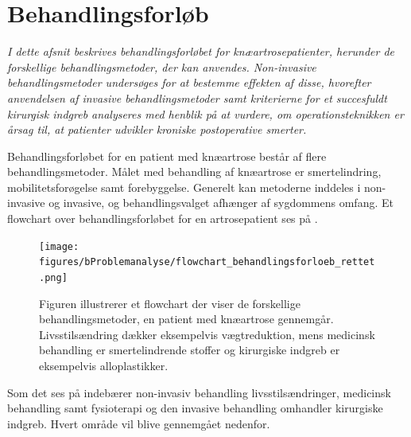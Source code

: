 \section{Behandlingsforløb}
\textit{I dette afsnit beskrives behandlingsforløbet for knæartrosepatienter, herunder de forskellige behandlingsmetoder, der kan anvendes. Non-invasive behandlingsmetoder undersøges for at bestemme effekten af disse, hvorefter anvendelsen af invasive behandlingsmetoder samt kriterierne for et succesfuldt kirurgisk indgreb analyseres med henblik på at vurdere, om operationsteknikken er årsag til, at patienter udvikler kroniske postoperative smerter.}

Behandlingsforløbet for en patient med knæartrose består af flere behandlingsmetoder. Målet med behandling af knæartrose er smertelindring, mobilitetsforøgelse samt forebyggelse. Generelt kan metoderne inddeles i non-invasive og invasive, og behandlingsvalget afhænger af sygdommens omfang. \citep{Lind2016b} Et flowchart over behandlingsforløbet for en artrosepatient ses på . 

\begin{figure}[H]
	\centering
	\texttt{[image: figures/bProblemanalyse/flowchart\_behandlingsforloeb\_rettet.png]}
	\caption{Figuren illustrerer et flowchart der viser de forskellige behandlingsmetoder, en patient med knæartrose gennemgår. Livsstilsændring dækker eksempelvis vægtreduktion, mens medicinsk behandling er smertelindrende stoffer og kirurgiske indgreb er eksempelvis alloplastikker. \citep{Lind2016b}}
	\label{fig:flow_behandlingsfaser}
\end{figure}\vspace{-.25cm}

Som det ses på  indebærer non-invasiv behandling livsstilsændringer, medicinsk behandling samt fysioterapi og den invasive behandling omhandler kirurgiske indgreb. Hvert område vil blive gennemgået nedenfor.  

